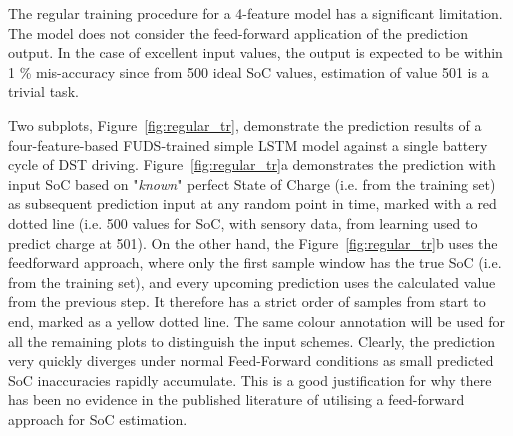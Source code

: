 The regular training procedure for a 4-feature model has a significant limitation. The model does not consider the feed-forward application of the prediction output.
In the case of excellent input values, the output is expected to be within 1 \% mis-accuracy since from 500 ideal SoC values, estimation of value 501 is a trivial task.

%
%
Two subplots, \mbox{Figure~\ref{fig:regular_tr}}, demonstrate the prediction results of a four-feature-based FUDS-trained simple LSTM model against a single battery cycle of DST driving.
\mbox{Figure~\ref{fig:regular_tr}a} demonstrates the prediction with input SoC based on "\textit{known}" perfect State of Charge (i.e. from the training set) as subsequent prediction input at any random point in time, marked with a red dotted line (i.e. 500 values for SoC, with sensory data, from learning used to predict charge at 501).
On the other hand, the \mbox{Figure~\ref{fig:regular_tr}b} uses the feedforward approach, where only the first sample window has the true SoC (i.e. from the training set), and every upcoming prediction uses the calculated value from the previous step.
It therefore has a strict order of samples from start to end, marked as a yellow dotted line.
The same colour annotation will be used for all the remaining plots to distinguish the input schemes.
Clearly, the prediction very quickly diverges under normal Feed-Forward conditions as small predicted SoC inaccuracies rapidly accumulate. %
This is a good justification for why there has been no evidence in the published literature of utilising a feed-forward approach for SoC estimation.
